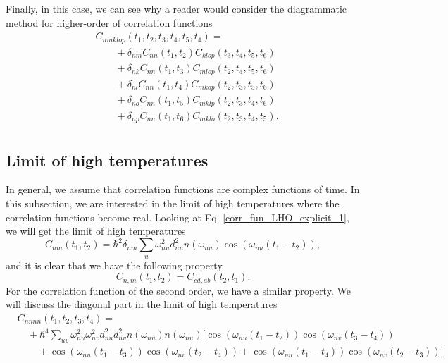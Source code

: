 \noindent Finally, in this case, we can see why a reader would consider the diagrammatic method for higher-order of correlation functions
\begin{equation}
\label{corr_fun_3rd_decomposition_local}
    \begin{aligned}
        &C_{nmklop}(t_1, t_2, t_3, t_4, t_5, t_4) = \\
        &\quad\quad + \delta_{nm} C_{nn}(t_1, t_2) C_{klop}(t_3, t_4, t_5, t_6) \\
        &\quad\quad + \delta_{nk} C_{nn}(t_1, t_3) C_{mlop}(t_2, t_4, t_5, t_6) \\
        &\quad\quad + \delta_{nl}  C_{nn}(t_1, t_4) C_{mkop}(t_2, t_3, t_5, t_6) \\
        &\quad\quad + \delta_{no} C_{nn}(t_1, t_5) C_{mklp}(t_2, t_3, t_4, t_6) \\
        &\quad\quad + \delta_{np}  C_{nn}(t_1, t_6) C_{mklo}(t_2, t_3, t_4, t_5). \\
    \end{aligned}
\end{equation}

\subsection{Limit of high temperatures}

In general, we assume that correlation functions are complex functions of time. In this subsection, we are interested in the limit of high temperatures where the correlation functions become real. Looking at Eq. \ref{corr_fun_LHO_explicit_1}, we will get the limit of high temperatures
\begin{equation}
\label{corr_fun_LHO_explicit_hightemp}
    C_{nm}(t_1, t_2) = \hbar^2 \delta_{nm} \sum_{u} \omega_{nu}^2 d_{nu}^2 n(\omega_{nu})\cos(\omega_{nu}(t_1-t_2)),
\end{equation}
and it is clear that we have the following property
\begin{equation}
\label{corr_fun_1st_prop_real}
    C_{n,m}(t_1, t_2) = C_{cd,ab}(t_2, t_1).
\end{equation}
For the correlation function of the second order, we have a similar property. We will discuss the diagonal part in the limit of high temperatures
\begin{equation}
\label{corr_fun_2nd_real_pro2}
    \begin{aligned}
        &C_{nnnn}(t_1, t_2, t_3, t_4) = \\
        &\quad +\hbar^4 \sum_{uv} \omega_{nu}^2 \omega_{nv}^2 d_{nu}^2 d_{nv}^2 n(\omega_{nu})n(\omega_{nu})  \Big[ \cos(\omega_{nu}(t_1-t_2))\cos(\omega_{nv}(t_3-t_4)) \\
        &\quad \quad +\cos(\omega_{nu}(t_1-t_3))\cos(\omega_{nv}(t_2-t_4)) + \cos(\omega_{nu}(t_1-t_4))\cos(\omega_{nv}(t_2-t_3)) \Big]  \\
    \end{aligned}
\end{equation}

